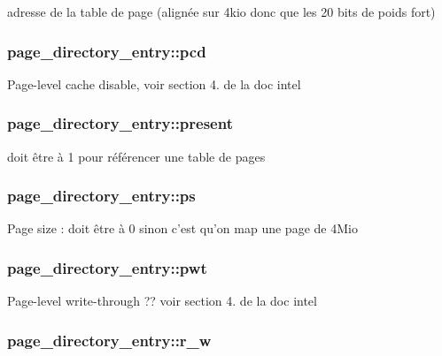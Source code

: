 adresse de la table de page (alignée sur 4kio donc que les 20 bits de poids fort) \hypertarget{structpage__directory__entry_ae480766b759f04eeb2443e12d185616a}{
\subsubsection[{pcd}]{ page\-\_\-directory\-\_\-entry\-::pcd}}\label{structpage__directory__entry_ae480766b759f04eeb2443e12d185616a}
Page-\/level cache disable, voir section 4. de la doc intel \hypertarget{structpage__directory__entry_ac5b5f5ab165ce60453db02e68bd7cc22}{
\subsubsection[{present}]{ page\-\_\-directory\-\_\-entry\-::present}}\label{structpage__directory__entry_ac5b5f5ab165ce60453db02e68bd7cc22}
doit être à 1 pour référencer une table de pages \hypertarget{structpage__directory__entry_a35108b74ca7560e2ecf3f296d375c87f}{
\subsubsection[{ps}]{ page\-\_\-directory\-\_\-entry\-::ps}}\label{structpage__directory__entry_a35108b74ca7560e2ecf3f296d375c87f}
Page size \-: doit être à 0 sinon c'est qu'on map une page de 4\-Mio \hypertarget{structpage__directory__entry_a8eea5779d287c1ef5e6f2073b93166a6}{
\subsubsection[{pwt}]{ page\-\_\-directory\-\_\-entry\-::pwt}}\label{structpage__directory__entry_a8eea5779d287c1ef5e6f2073b93166a6}
Page-\/level write-\/through ?? voir section 4. de la doc intel \hypertarget{structpage__directory__entry_af4aa8287c5da23728d33053fcb3f1715}{
\subsubsection[{r\-\_\-w}]{ page\-\_\-directory\-\_\-entry\-::r\-\_\-w}}\label{structpage__directory__entry_af4aa8287c5da23728d33053fcb3f1715}
